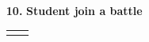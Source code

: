 \documentclass{article}
\begin{document}
{\begin{enumerate}

                    \item[\textbf{10.}] \textbf{Student join a battle}
                    \begin{xltabular}{\textwidth}
                        {| >{\raggedright\arraybackslash}g | >{\raggedright\arraybackslash}X |}      
                        \hline
                        \endfirsthead
                        \hline
                        \endhead
                        \endfoot
                        \hline
                        \endlastfoot
                        

                        
                        

\end{xltabular}
\end{enumerate}}
\end{document}
